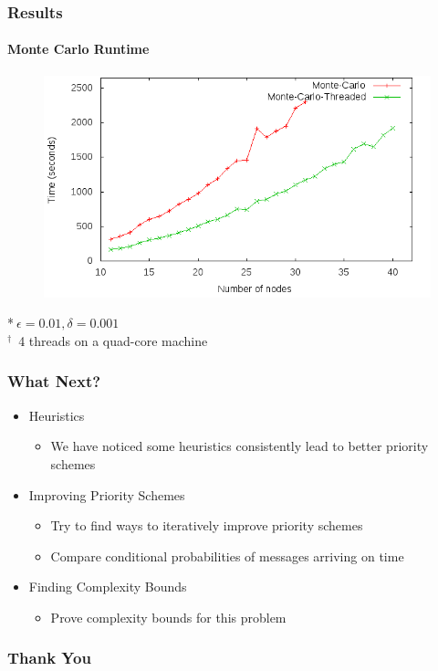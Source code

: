 \documentclass{beamer}
\begin{document}
\begin{frame}
\frametitle{Results}
\framesubtitle{Monte Carlo Runtime}
	\vspace*{-10pt}
	\begin{figure}
	\includegraphics[scale=0.5]{media/monte_carlo_runtime.png}\\
	\end{figure}
	\vspace*{-20pt}
	\tiny{*$\ \epsilon=0.01, \delta=0.001$\\
		$^{\dagger}$\ 4 threads on a quad-core machine}
\end{frame}

\begin{frame}
\frametitle{What Next?}
	\begin{itemize}
	\item Heuristics
		\begin{itemize}
		\item We have noticed some heuristics consistently lead to better priority schemes
		\end{itemize}
	\item Improving Priority Schemes
		\begin{itemize}
		\item Try to find ways to iteratively improve priority schemes
		\item Compare conditional probabilities of messages arriving on time
		\end{itemize}
	\item Finding Complexity Bounds
		\begin{itemize}
		\item Prove complexity bounds for this problem
		\end{itemize}
	\end{itemize}
\end{frame}


\begin{frame}
\frametitle{Thank You}
\end{frame}
\end{document}
